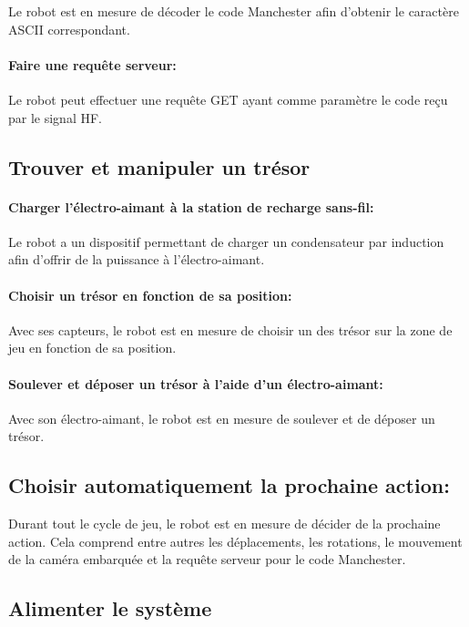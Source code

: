 Le robot est en mesure de décoder le code Manchester afin d'obtenir le caractère ASCII correspondant.

\paragraph{Faire une requête serveur:}

Le robot peut effectuer une requête GET ayant comme paramètre le code reçu par le signal HF.

\subsection{Trouver et manipuler un trésor}

\paragraph{Charger l'électro-aimant à la station de recharge sans-fil:}

Le robot a un dispositif permettant de charger un condensateur par induction afin d'offrir de la puissance à l'électro-aimant.

\paragraph{Choisir un trésor en fonction de sa position:}

Avec ses capteurs, le robot est en mesure de choisir un des trésor sur la zone de jeu en fonction de sa position.

\paragraph{Soulever et déposer un trésor à l'aide d'un électro-aimant:}

Avec son électro-aimant, le robot est en mesure de soulever et de déposer un trésor.

\subsection{Choisir automatiquement la prochaine action:}

Durant tout le cycle de jeu, le robot est en mesure de décider de la prochaine action. Cela comprend entre autres les déplacements, les rotations, le mouvement de la caméra embarquée
et la requête serveur pour le code Manchester.

\subsection{Alimenter le système}

